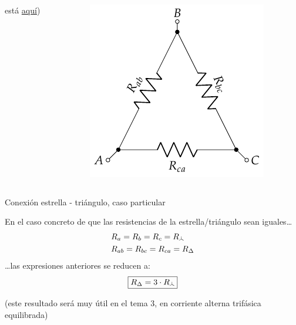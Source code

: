 \documentclass[aspectratio=169, xcolor={usenames,svgnames,dvipsnames}]{beamer}
\newcommand\wye{\scalerel*{\stackengine{-1pt}{%
  \rotatebox[origin=c]{30}{\rule{10pt}{.9pt}}\kern-1pt%
  \rotatebox[origin=c]{-30}{\rule{10pt}{1.3pt}}}{%
  \rule{.9pt}{10pt}}{O}{c}{F}{F}{S}}{\Delta}} %
\begin{document}
\begin{frame}
\begin{columns}
\begin{column}{0.4\columnwidth}
{    está \href{https://spinningnumbers.org/a/delta-wye-derivations.html\#text-y-to-delta-derivation-with-conductance}{aquí})} %
    \end{column}
    \begin{column}{0.3\columnwidth}
    \begin{center}
    \includegraphics[width=.9\linewidth]{../figs/Conexion_Triangulo.pdf}
    \end{center}
    \end{column}
    \end{columns}
\end{frame}


\begin{frame}{Conexión estrella - triángulo, \hspace{3mm}caso particular}
    
    En el caso concreto de que las resistencias de la estrella/triángulo sean \alert{iguales}\ldots{}
    \begin{align*}
      &R_a=R_b=R_c=R_{\wye}\\
      & R_{ab}=R_{bc}=R_{ca}=R_{\Delta}
    \end{align*}
    \ldots{}las expresiones anteriores se reducen a:
    \begin{equation*}
      \boxed{R_{\Delta} = 3\cdot R_{\wye}}
    \end{equation*}
    
    \centering \small{(este resultado será muy útil en el tema 3, en \alert{corriente alterna trifásica} equilibrada)}
\end{frame}
\end{document}
